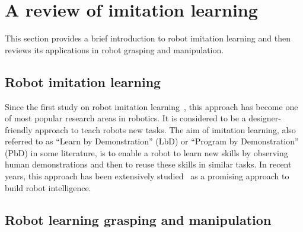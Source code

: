 \section{A review of imitation learning}
\label{cha2:sec2}

This section provides a brief introduction to robot imitation learning and then reviews its applications in robot grasping and manipulation.

\subsection{Robot imitation learning}
\label{cha2:sec2:learning}
Since the first study on robot imitation learning~\citep{friedrich1996robot}, this approach has become one of most popular research areas in robotics. It is considered to be a designer-friendly approach to teach robots new tasks. The aim of imitation learning, also referred to as ``Learn by Demonstration'' (LbD) or ``Program by Demonstration'' (PbD) in some literature, is to enable a robot to learn new skills by observing human demonstrations and then to reuse these skills in similar tasks. In recent years, this approach has been extensively studied~\citep{calinon2007learning,calinon2008robot,dillmann2004teaching,kulic2012incremental} as a promising approach to build robot intelligence.

\subsection{Robot learning grasping and manipulation }
\label{cha2:sec2:grasping-learning}


